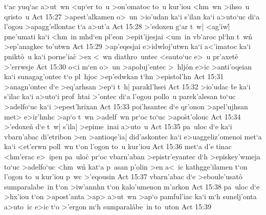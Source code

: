 t`ac
yuq`ac
a>ut~wn
<up`er
to~u
>on'omatoc
to~u
kur'iou
<hm~wn
>ihso~u
qristo~u\bibvsend
\vs Act 15:27
>apest'alkamen
o>~un
>io'udan
ka`i
s'ilan
ka`i
a>uto`uc
di`a
l'ogou
>apagg'ellontac
t`a
a>ut'a\bibvsend
\vs Act 15:28
>'edoxen
g`ar
t~w|
<ag'iw|\r{}
pne'umati
ka`i
<hm~in
mhd`en
pl'eon
>epit'ijesjai
<um~in
vb'aroc
pl`hn
t~wn\r{}
>ep'anagkec
to'utwn\bibvsend
\vs Act 15:29
>ap'eqesjai
e>idwloj'utwn
ka`i
a<'imatoc
ka`i
pnikt\r{o}~u
ka`i
porne'ia\r{c}
>ex
<~wn
diathro~untec
<eauto`uc
e>~u
pr'axet\r{e}
>'errwsje\bibvsend
\vs Act 15:30
o<i
m`en
o>~un
>apoluj'entec
>~hlj\r{o}n
e>ic
>anti'oqeian
ka`i
sunagag'ontec
t`o
pl~hjoc
>ep'edwkan
t`hn
>epistol'hn\bibvsend
\vs Act 15:31
>anagn'ontec
d`e
>eq'arhsan
>ep`i
t~h|
parakl'hsei\bibvsend
\vs Act 15:32
>io'udac
\r{t}e
ka`i
s'ilac
ka`i
a>uto`i
prof~htai
>'ontec
di`a
l'ogou
pollo~u
parek'alesan
to`uc
>adelfo`uc
ka`i
>epest'hrixan\bibvsend
\vs Act 15:33
poi'hsantec
d`e
qr'onon
>apel'ujhsan
met>
e>ir'hnhc
>ap`o
t~wn
>adelf~wn
pr`oc
to`uc
>apo\r{s}t'olouc\bibvsend
{}
\vs Act 15:34
>'edoxen\r{}
d`e
t~w|
s'ila|
>epime~inai
a>uto~u\bibvsend
\vs Act 15:35
pa~uloc
d`e
ka`i
vbarn'abac
di'etribon
>en
>antioqe'ia|
did'askontec
ka`i
e>uaggeliz'omenoi
met`a
ka`i
<et'erwn
poll~wn
t`on
l'ogon
to~u
kur'iou\bibvsend
\vs Act 15:36
met`a
d'e
tinac
<hm'erac
e>~ipen
pa~uloc\r{}
pr`oc
vbarn'aban
>epistr'eyantec
d`h
>episkey'wmeja
to`uc
>adelfo`uc
<hm~wn\r{}
kat`a
p~asan
p'olin
>en
a<~ic
kathgge'ilamen
t`on
l'ogon
to~u
kur'iou
p~wc
>'eqousin\bibvsend
\vs Act 15:37
vbarn'abac
d`e
>eboule'usato\r{}
sumparalabe~in
\r{t}`on
>iw'annhn
t`on
kalo'umenon
m'arkon\bibvsend
\vs Act 15:38
pa~uloc
d`e
>hx'iou
t`on
>apost'anta
>ap>
a>ut~wn
>ap`o
pamful'iac
ka`i
m`h
sunelj'onta
a>uto~ic
e>ic
t`o
>'ergon
m`h
sumparal\r{a}be~in
to~uton\bibvsend
\vs Act 15:39
